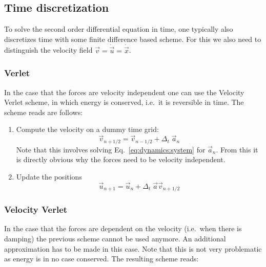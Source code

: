 \documentclass[times,namecite]{goose-article}
\begin{document}
\subsection{Time discretization}
\label{eq:dynamics:time}

To solve the second order differential equation in time, one typically also discretizes time with some finite difference based scheme. For this we also need to distinguish the velocity field $\vec{v} = \dot{\vec{u}} = \dot{\vec{x}}$.

\subsubsection{Verlet}

In the case that the forces are velocity independent one can use the Velocity Verlet scheme, in which energy is conserved, i.e.\ it is reversible in time. The scheme reads are follows:

\begin{enumerate}
  \item Compute the velocity on a dummy time grid:
  \begin{equation}
    \vec{v}_{n+1/2} = \vec{v}_{n-1/2} + \Delta_t \; \vec{a}_n
  \end{equation}
  Note that this involves solving Eq.~\eqref{eq:dynamics:system} for $\vec{a}_n$. From this it is directly obvious why the forces need to be velocity independent.
  \item Update the positions
  \begin{equation}
    \vec{u}_{n+1} = \vec{u}_n + \Delta_t \;\vec{a} \vec{v}_{n + 1/2}
  \end{equation}
\end{enumerate}

\subsubsection{Velocity Verlet}

In the case that the forces are dependent on the velocity (i.e.\ when there is damping) the previous scheme cannot be used anymore. An additional approximation has to be made in this case. Note that this is not very problematic as energy is in no case conserved. The resulting scheme reads:
\end{document}
